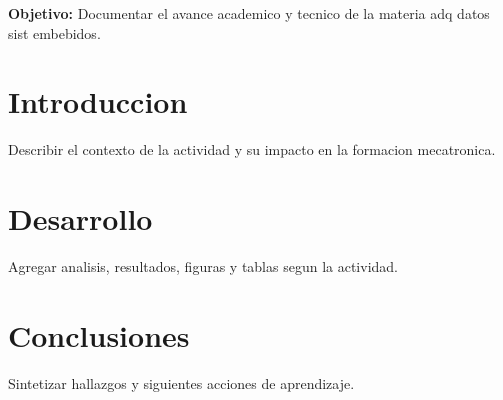 \documentclass[spanish,letterpaper,oneside]{article}
\begin{document}
\templatePortrait
\templatePagecfg
\onehalfspacing

\begin{abstractd}
\textbf{Objetivo:} Documentar el avance academico y tecnico de la materia adq datos sist embebidos.
\end{abstractd}

\templateIndex
\templateFinalcfg

\section{Introduccion}
Describir el contexto de la actividad y su impacto en la formacion mecatronica.

\section{Desarrollo}
Agregar analisis, resultados, figuras y tablas segun la actividad.

\section{Conclusiones}
Sintetizar hallazgos y siguientes acciones de aprendizaje.



\end{document}
